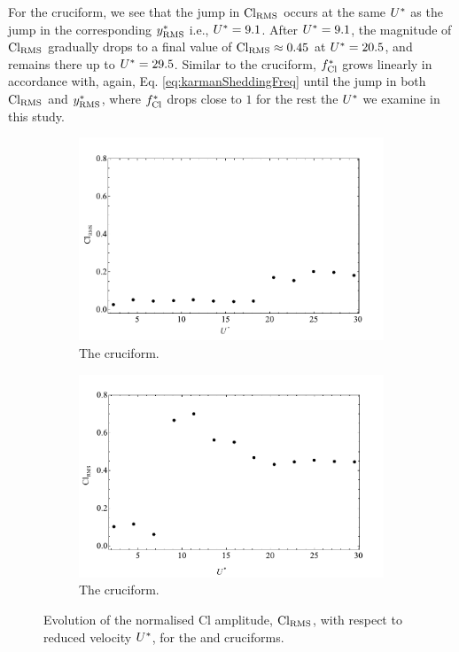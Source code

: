 \documentclass[oneside]{utmthesis}
\begin{document}
For the \angon{} cruciform, we see that the jump in $\text{Cl}_{\text{RMS}}$ occurs at the same $U^{*}$ as the jump in the corresponding $y^{*}_{\text{RMS}}$ i.e., $U^{*} = 9.1$. After $U^{*} = 9.1$, the magnitude of $\text{Cl}_{\text{RMS}}$ gradually drops to a final value of $\text{Cl}_{\text{RMS}} \approx 0.45$ at $U^{*} = 20.5$, and remains there up to $U^{*} = 29.5$. Similar to the \angtw{} cruciform, $f_{\text{Cl}}^{*}$ grows linearly in accordance with, again, Eq. \ref{eq:karmanSheddingFreq} until the jump in both $\text{Cl}_{\text{RMS}}$ and $y^{*}_{\text{RMS}}$, where $f_{\text{Cl}}^{*}$ drops close to $1$ for the rest the $U^{*}$ we examine in this study.

\begin{figure}
  \centering
  \begin{subfigure}[h]{1\textwidth}
    \includegraphics[width=\textwidth]{figs/clRMS2}
    \caption{The \angtw{} cruciform.}
    \label{fig:clRMS2}
  \end{subfigure}
  
  \begin{subfigure}[h]{1\textwidth}
    \includegraphics[width=\textwidth]{figs/clRMS1}
    \caption{The \angon{} cruciform.}
    \label{fig:clRMS1}
  \end{subfigure}

  \label{fig:clRMS21}
  \caption{Evolution of the normalised Cl \rms{} amplitude, $\text{Cl}_{\text{RMS}}$, with respect to reduced velocity $U^{*}$, for the \angtw{} and \angon{} cruciforms.}
\end{figure}
\end{document}
